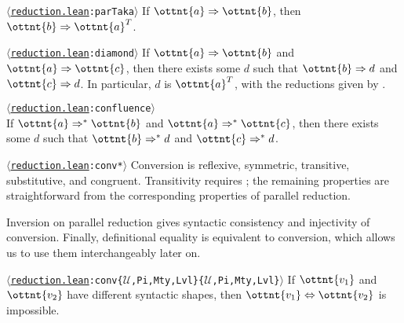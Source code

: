\documentclass[a4paper,UKenglish,cleveref,autoref,thm-restate]{lipics-v2021}
\newcommand{\repo}{https://github.com/ionathanch/TTBFL}
\newcommand{\thmref}[2]{%
  $\langle$\href{\repo/tree/main/src/#1}{\texttt{#1}}\texttt{:#2}$\rangle$%
}
\begin{document}
\begin{lemma}[Completion (p.r.)] \thmref{reduction.lean}{parTaka} \label{lem:par:compl}
  If $ \ottnt{a}  \Rightarrow  \ottnt{b} $, then $ \ottnt{b}  \Rightarrow   \ottnt{a} ^{ \mathsf{T} }  $.
\end{lemma}

\begin{corollary}[Diamond (p.r.)] \thmref{reduction.lean}{diamond} \label{lem:par:diamond}
  If $ \ottnt{a}  \Rightarrow  \ottnt{b} $ and $ \ottnt{a}  \Rightarrow  \ottnt{c} $,
  then there exists some $d$ such that $ \ottnt{b}  \Rightarrow  d $ and $ \ottnt{c}  \Rightarrow  d $.
  In particular, $d$ is $ \ottnt{a} ^{ \mathsf{T} } $,
  with the reductions given by .
\end{corollary}

\begin{theorem}[Confluence (p.r.)] \thmref{reduction.lean}{confluence} \label{lem:par:confl} \\
  If $ \ottnt{a}  \Rightarrow^\ast  \ottnt{b} $ and $ \ottnt{a}  \Rightarrow^\ast  \ottnt{c} $,
  then there exists some $d$ such that $ \ottnt{b}  \Rightarrow^\ast  d $ and $ \ottnt{c}  \Rightarrow^\ast  d $.
\end{theorem}

\begin{corollary} \thmref{reduction.lean}{conv*} \label{lem:conv}
  Conversion is reflexive, symmetric, transitive, substitutive, and congruent.
  Transitivity requires ;
  the remaining properties are straightforward
  from the corresponding properties of parallel reduction.
\end{corollary}

Inversion on parallel reduction gives syntactic consistency and injectivity of conversion.
Finally, definitional equality is equivalent to conversion,
which allows us to use them interchangeably later on.

\begin{lemma} \thmref{reduction.lean}{conv\{$\mathcal{U}$,Pi,Mty,Lvl\}\{$\mathcal{U}$,Pi,Mty,Lvl\}} \label{lem:par:consistency}
  If $\ottnt{v_{{\mathrm{1}}}}$ and $\ottnt{v_{{\mathrm{2}}}}$ have different syntactic shapes,
  then $ \ottnt{v_{{\mathrm{1}}}}  \Leftrightarrow  \ottnt{v_{{\mathrm{2}}}} $ is impossible.
\end{lemma}
\end{document}
